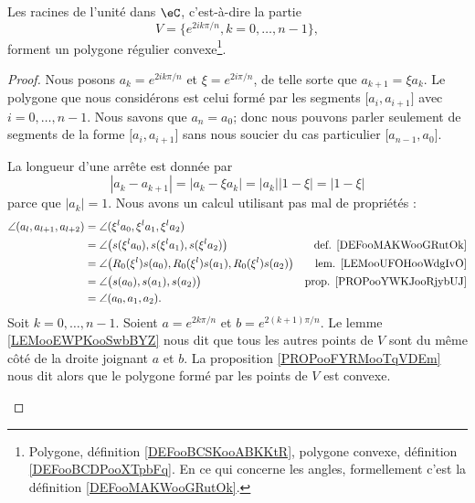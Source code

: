 \begin{proposition}     \label{PROPooUPPTooZBFvPg}
	Les racines de l'unité dans \( \eC\), c'est-à-dire la partie
	\begin{equation}
		V=\{  e^{2ik\pi/n},k=0,\ldots, n-1 \},
	\end{equation}
	forment un polygone régulier convexe\footnote{Polygone, définition \ref{DEFooBCSKooABKKtR}, polygone convexe, définition \ref{DEFooBCDPooXTpbFq}. En ce qui concerne les angles, formellement c'est la définition \ref{DEFooMAKWooGRutOk}.}.
\end{proposition}

\begin{proof}
	Nous posons \( a_k= e^{2ik\pi /n}\) et \( \xi= e^{2i\pi/n}\), de telle sorte que \( a_{k+1}=\xi a_k\). Le polygone que nous considérons est celui formé par les segments \( \mathopen[ a_i , a_{i+1} \mathclose]\) avec \( i=0,\ldots, n-1\). Nous savons que \( a_n=a_0\); donc nous pouvons parler seulement de segments de la forme \( \mathopen[ a_i , a_{i+1} \mathclose]\) sans nous soucier du cas particulier \( \mathopen[ a_{n-1} , a_0 \mathclose]\).
	\begin{subproof}
		\spitem[Longueurs]
		La longueur d'une arrête est donnée par
		\begin{equation}
			| a_k-a_{k+1} |=| a_k-\xi a_k |=| a_k | |1-\xi |=| 1-\xi |
		\end{equation}
		parce que \( | a_k |=1\).
		\spitem[Angles]
		Nous avons un calcul utilisant pas mal de propriétés :
		\begin{subequations}
			\begin{align}
				\angle(a_l,a_{l+1},a_{l+2}) & =\angle(\xi^la_0,\xi^la_1,\xi^la_2)                                                                           \\
				                            & =\angle\big( s(\xi^la_0),s(\xi^la_1),s(\xi^la_2) \big)                & \text{def. \ref{DEFooMAKWooGRutOk}}   \\
				                            & =\angle\big( R_0(\xi^l)s(a_0),R_0(\xi^l)s(a_1),R_0(\xi^l)s(a_2) \big) & \text{lem. \ref{LEMooUFOHooWdgIvO}}   \\
				                            & =\angle\big( s(a_0), s(a_1), s(a_2) \big)                             & \text{prop. \ref{PROPooYWKJooRjybUJ}} \\
				                            & =\angle(a_0,a_1,a_2).
			\end{align}
		\end{subequations}
		\spitem[Convexe]
		Soit \( k=0,\ldots,n-1\). Soient \( a=e^{2k\pi/n}\) et \( b=e^{2(k+1)\pi/n}\). Le lemme \ref{LEMooEWPKooSwbBYZ} nous dit que tous les autres points de \( V\) sont du même côté de la droite joignant \( a\) et \( b\). La proposition \ref{PROPooFYRMooTqVDEm} nous dit alors que le polygone formé par les points de \( V\) est convexe.
	\end{subproof}
\end{proof}


